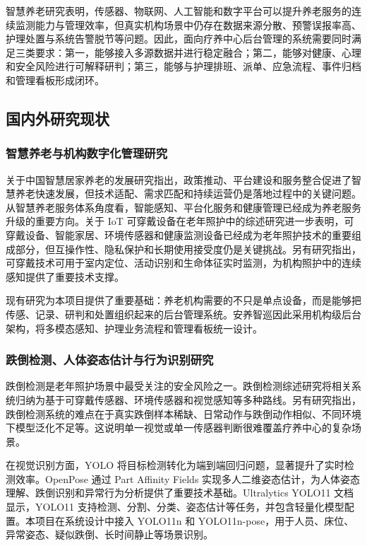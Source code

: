 \documentclass[UTF8,a4paper,zihao=-4,fontset=fandol]{ctexart}
\begin{document}
智慧养老研究表明，传感器、物联网、人工智能和数字平台可以提升养老服务的连续监测能力与管理效率，但真实机构场景中仍存在数据来源分散、预警误报率高、护理处置与系统告警脱节等问题。因此，面向疗养中心后台管理的系统需要同时满足三类要求：第一，能够接入多源数据并进行稳定融合；第二，能够对健康、心理和安全风险进行可解释研判；第三，能够与护理排班、派单、应急流程、事件归档和管理看板形成闭环。

\subsection{国内外研究现状}

\subsubsection{智慧养老与机构数字化管理研究}

关于中国智慧居家养老的发展研究指出，政策推动、平台建设和服务整合促进了智慧养老快速发展，但技术适配、需求匹配和持续运营仍是落地过程中的关键问题\cite{zhang2020smart}。从智慧养老服务体系角度看，智能感知、平台化服务和健康管理已经成为养老服务升级的重要方向\cite{hung2023smart}。关于 IoT 可穿戴设备在老年照护中的综述研究进一步表明，可穿戴设备、智能家居、环境传感器和健康监测设备已经成为老年照护技术的重要组成部分，但互操作性、隐私保护和长期使用接受度仍是关键挑战\cite{stavropoulos2020iot}。另有研究指出，可穿戴技术可用于室内定位、活动识别和生命体征实时监测，为机构照护中的连续感知提供了重要技术支撑\cite{dong2017wearable}。

现有研究为本项目提供了重要基础：养老机构需要的不只是单点设备，而是能够把传感、记录、研判和处置组织起来的后台管理系统。安养智巡因此采用机构级后台架构，将多模态感知、护理业务流程和管理看板统一设计。

\subsubsection{跌倒检测、人体姿态估计与行为识别研究}

跌倒检测是老年照护场景中最受关注的安全风险之一。跌倒检测综述研究将相关系统归纳为基于可穿戴传感器、环境传感器和视觉感知等多种路线\cite{mubashir2013survey}。另有研究指出，跌倒检测系统的难点在于真实跌倒样本稀缺、日常动作与跌倒动作相似、不同环境下模型泛化不足等\cite{igual2013challenges}。这说明单一视觉或单一传感器判断很难覆盖疗养中心的复杂场景。

在视觉识别方面，YOLO 将目标检测转化为端到端回归问题，显著提升了实时检测效率\cite{redmon2016yolo}。OpenPose 通过 Part Affinity Fields 实现多人二维姿态估计，为人体姿态理解、跌倒识别和异常行为分析提供了重要技术基础\cite{cao2017realtime}。Ultralytics YOLO11 文档显示，YOLO11 支持检测、分割、分类、姿态估计等任务，并包含轻量化模型配置\cite{ultralytics2024yolo11}。本项目在系统设计中接入 YOLO11n 和 YOLO11n-pose，用于人员、床位、异常姿态、疑似跌倒、长时间静止等场景识别。
\end{document}

